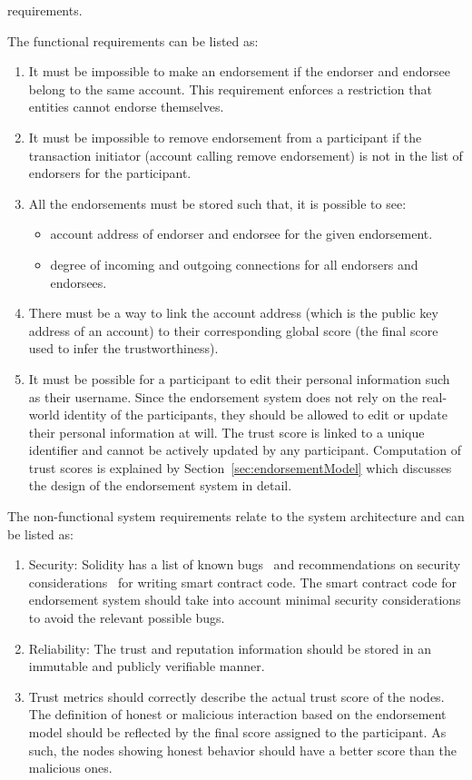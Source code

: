 requirements. \par
The functional requirements can be listed as: 
\begin{enumerate}
	\item It must be impossible to make an endorsement if the endorser and
		endorsee belong to the same account. \newline
		This requirement enforces a restriction that entities cannot endorse
		themselves.  
	\item It must be impossible to remove endorsement from a participant if the
		transaction initiator (account calling remove endorsement) is not in
		the list of endorsers for the participant.
	\item All the endorsements must be stored such that, it is possible to see: 
		\begin{itemize}
			\item account address of endorser and endorsee for the given
				endorsement. 
			\item degree of incoming and outgoing connections for all endorsers
				and endorsees.
		\end{itemize}
	\item There must be a way to link the account address (which is the public
		key address of an account) to their corresponding global score (the
		final score used to infer the trustworthiness).
	\item It must be possible for a participant to edit their personal
		information such as their username. Since the endorsement system does
		not rely on the real-world identity of the participants, they should be
		allowed to edit or update their personal information at will. The trust
		score is linked to a unique identifier and cannot be actively updated
		by any participant.  Computation of trust scores is explained by
		Section~\ref{sec:endorsementModel} which discusses the design of the
		endorsement system in detail. 
\end{enumerate}
The non-functional system requirements relate to the system architecture and
can be listed as:
\begin{enumerate}
	\item Security: Solidity has a list of known bugs~\cite{soliditySecurity}
		and recommendations on security considerations~\cite{solidityBugs} for
		writing smart contract code. The smart contract code for endorsement
		system should take into account minimal security considerations to
		avoid the relevant possible bugs. 
	\item Reliability: The  trust and reputation information should be stored
		in an immutable and publicly verifiable manner.
	\item Trust metrics should correctly describe the actual trust score of the
		nodes. The definition of honest or malicious interaction based on the
		endorsement model should be reflected by the final score assigned to
		the participant. As such, the nodes showing honest behavior should have
		a better score than the malicious ones.   
\end{enumerate}

